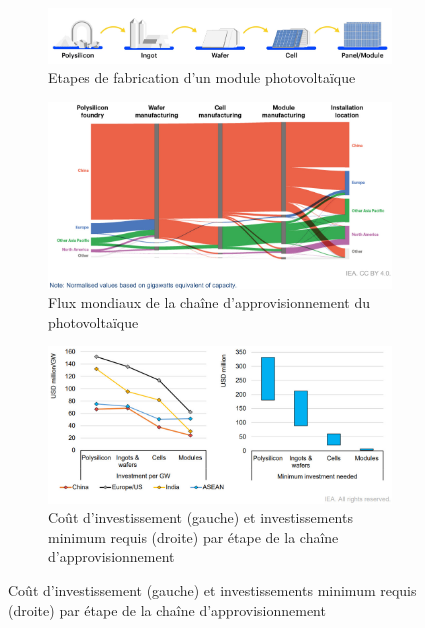 \begin{figure}[!t]
\centering
\begin{subfigure}{0.8\textwidth}
    \includegraphics[width=\textwidth]{Images/supply_chain/PV_supply_chain.jpg}
    \caption{Etapes de fabrication d'un module photovoltaïque}
    \label{fig:PV_supply}
\end{subfigure}
\hfill
\begin{subfigure}{0.8\textwidth}
    \includegraphics[width=\textwidth]{Images/supply_chain/sankey_diagram_PV_bis.jpg}
    \caption{Flux mondiaux de la chaîne d'approvisionnement du photovoltaïque \cite{iea_energy_2023}}
    \label{fig:PV_sankey}
\end{subfigure}
\hfill
\begin{subfigure}{0.8\textwidth}
    \includegraphics[width=\textwidth]{Images/supply_chain/PV_investment.jpg}
    \caption{Coût d'investissement (gauche) et investissements minimum requis (droite) par étape de la chaîne d'approvisionnement \cite{iea_special_2022}}
    \label{fig:PV_investment}

\end{subfigure}
\end{figure}
